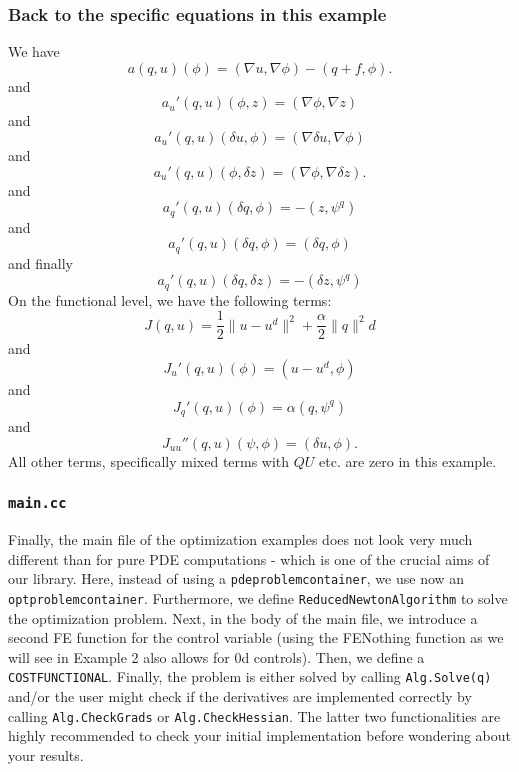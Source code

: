\subsubsection{Back to the specific equations in this example}
We have
\[
a(q,u)(\phi) = (\nabla u, \nabla\phi) - (q + f, \phi).
\]
and
\[
a_u'(q,u)(\phi, z) = (\nabla\phi, \nabla z)
\]
and
\[
a_u'(q,u)(\delta u, \phi) = (\nabla\delta u, \nabla\phi)
\]
and
\[
a_u'(q,u)(\phi, \delta z) = (\nabla\phi, \nabla\delta z).
\]
and 
\[
a_q'(q,u)(\delta q, \phi) = -(z,\psi^q)
\]
and 
\[
a_q'(q,u)(\delta q, \phi) = (\delta q,\phi)
\]
and finally
\[
a_{q}'(q,u)(\delta q,\delta z) = - (\delta z,\psi^q)
\]
On the functional level, we have the following terms:
\[
J(q,u) = \frac{1}{2} \|u-u^d\|^2 + \frac{\alpha}{2}\|q\|^2d
\]
and 
\[
J_u'(q,u)(\phi) = (u-u^d, \phi)
\]
and
\[
J_q'(q,u)(\phi) = \alpha (q,\psi^q)
\]
and 
\[
J_{uu}''(q,u)(\psi, \phi) = (\delta u, \phi).
\]
All other terms, specifically mixed terms with $QU$ etc. are zero in this
example. 

\subsubsection{\texttt{main.cc}}
Finally, the main file of the optimization examples does not look very much 
different than for pure PDE computations - which is one of the crucial aims 
of our library. 
Here, instead of using a \texttt{pdeproblemcontainer}, we use 
now an \texttt{optproblemcontainer}. Furthermore, 
we define \texttt{ReducedNewtonAlgorithm} to solve the optimization problem.
Next, in the body of the main file, we introduce a second FE function for the 
control variable (using the FE\underline{}Nothing function as we will see 
in Example 2 also allows for 0d controls). Then, we define 
a \texttt{COSTFUNCTIONAL}. Finally, the problem is either solved 
by calling \texttt{Alg.Solve(q)} and/or the user might check if the 
derivatives are implemented correctly by calling 
\texttt{Alg.CheckGrads} or \texttt{Alg.CheckHessian}. The latter 
two functionalities are highly recommended to check your initial 
implementation before wondering about your results.

